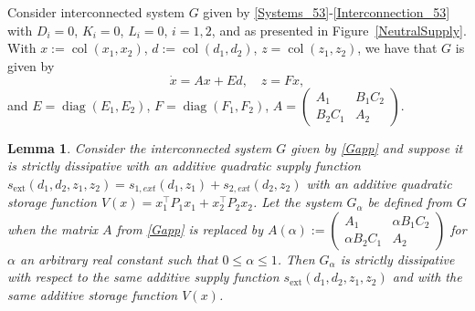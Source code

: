 \documentclass[11pt,a4paper,oneside,DIV=12,headings=small]{scrartcl}
\newcommand{\diag}{\operatorname{diag}}
\newcommand{\col}{\operatorname{col}}
\newtheorem{lemma}[theorem]{Lemma}
\theoremstyle{plain}
\begin{document}
Consider interconnected system $G$ given by \eqref{Systems_53}-\eqref{Interconnection_53}  with $D_i=0$, $K_i=0$, $L_i=0$, $i=1,2$, and as presented in Figure~\ref{NeutralSupply}. With $x:=\col(x_1,x_2)$, $d:=\col(d_1,d_2)$, $z=\col(z_1,z_2)$, we have that $G$ is given by
\begin{equation}
\label{Gapp}
\dot{x}=Ax+Ed, \quad z=Fx,
\end{equation} 
and $E=\diag(E_1,E_2)$, $F=\diag(F_1,F_2)$, $A=\left(\begin{smallmatrix} A_1 & B_1 C_2 \\ B_2 C_1 & A_2 \end{smallmatrix}\right)$.
\begin{lemma}
\label{Lemma1}
Consider the interconnected system $G$ given by \eqref{Gapp} and suppose it is strictly dissipative with an additive quadratic supply function 
$
s_{\text{ext}}(d_1,d_2,z_1,z_2)=s_{1,ext}(d_1,z_1)+s_{2,ext}(d_2,z_2)
$
with an additive quadratic storage function $V(x)=x_1^\top P_1 x_1+x_2^\top P_2 x_2$. Let the system $G_{\alpha}$ be defined from $G$ when the matrix $A$ from \eqref{Gapp} is replaced by $A(\alpha):=\left(\begin{smallmatrix}A_1 & \alpha B_1 C_2 \\ \alpha B_2 C_1 & A_2\end{smallmatrix}\right)$
for $\alpha$ an arbitrary real constant such that $0 \leq \alpha \leq 1$. Then $G_{\alpha}$ is strictly dissipative with respect to the same additive supply function $s_{\text{ext}}(d_1,d_2,z_1,z_2)$ and with the same additive storage function $V(x)$.
\end{lemma}
\end{document}
